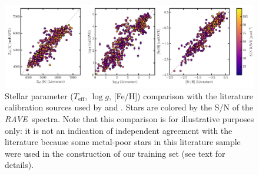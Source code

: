 \documentclass[preprint]{aastex}
\newcommand{\acronym}[1]{{\small{#1}}}
\newcommand{\project}[1]{\textsl{#1}}
\newcommand{\rave}{\project{\acronym{RAVE}}}
\newcommand{\teff}{T_{\mathrm{eff}}}
\newcommand{\logg}{\log g}
\begin{document}
\begin{figure}[p]
\includegraphics[width=\textwidth]{figures/kordopatis-calibration.pdf}
\caption{Stellar parameter ($\teff$, $\logg$, [Fe/H]) comparison with the literature calibration sources used by \citet{Kordopatis_2013} and \citet{Kunder_2016}. Stars are colored by the S/N of the \rave\ spectra. Note that this comparison is for illustrative purposes only: it is not an indication of independent agreement with the literature because some metal-poor stars in this literature sample were used in the construction of our training set (see text for details).\label{fig:kordopatis-calibration}}
\end{figure}
\end{document}
